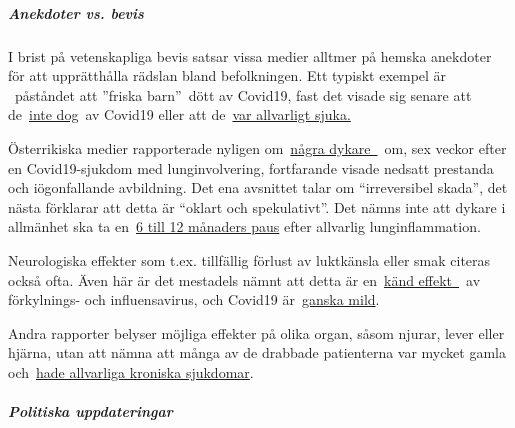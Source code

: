 \hypertarget{anekdoter-vs-bevis}{%
\subparagraph{\texorpdfstring{\textbf{Anekdoter vs.
bevis}}{Anekdoter vs. bevis}}\label{anekdoter-vs-bevis}}

I brist på vetenskapliga bevis satsar vissa medier alltmer på hemska
anekdoter för att upprätthålla rädslan bland befolkningen. Ett typiskt
exempel är ~påståndet att ''friska barn''~dött av Covid19, fast det
visade sig senare att
de~\href{https://www.dailymail.co.uk/news/article-8193487/Coroner-refuses-rule-COVID-19-cause-death-six-week-old-Connecticut-baby.html}{inte
dog}~av Covid19 eller att
de~\href{https://www.msn.com/de-ch/news/other/spanischer-nachwuchs-trainer-stirbt-an-corona/ar-BB11gT64}{var
allvarligt sjuka.}

Österrikiska medier rapporterade nyligen
om~\href{https://www.rainews.it/tgr/tagesschau/articoli/2020/04/tag-Coronavirus-Lungeschaden-Forschung-Uniklinik-Innsbruck-6708e11e-28dc-4843-a760-e7f926ace61c.html}{några
dykare~}~om, sex veckor efter en Covid19-sjukdom med lunginvolvering,
fortfarande visade nedsatt prestanda och iögonfallande avbildning. Det
ena avsnittet talar om ``irreversibel skada'', det nästa förklarar att
detta är ``oklart och spekulativt''. Det nämns inte att dykare i
allmänhet ska ta
en~\href{https://www.gesundheitsfrage.net/g/frage/tauchen-lungenentzuendung}{6
till 12 månaders paus} efter allvarlig lunginflammation.

Neurologiska effekter som t.ex. tillfällig förlust av luktkänsla eller
smak citeras också ofta. Även här är det mestadels nämnt att detta är
en~\href{https://www.ncbi.nlm.nih.gov/pubmed/25294743}{känd effekt~}~av
förkylnings- och influensavirus, och Covid19
är~\href{https://www.ncbi.nlm.nih.gov/pubmed/23948436}{ganska mild}.

Andra rapporter belyser möjliga effekter på olika organ, såsom njurar,
lever eller hjärna, utan att nämna att många av de drabbade patienterna
var mycket gamla
och~\href{https://www.epicentro.iss.it/coronavirus/sars-cov-2-decessi-italia}{hade
allvarliga kroniska sjukdomar}.

\hypertarget{politiska-uppdateringar}{%
\subparagraph{\texorpdfstring{\textbf{Politiska
uppdateringar}}{Politiska uppdateringar}}\label{politiska-uppdateringar}}


